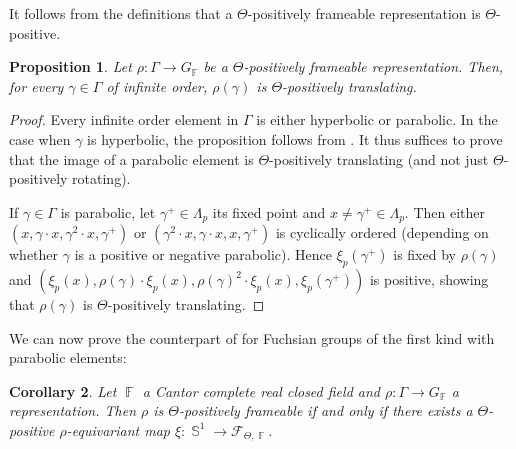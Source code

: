 \documentclass{amsart}
\theoremstyle{plain}
\newtheorem{proposition}{Proposition}[section]
\newtheorem{corollary}[proposition]{Corollary}
\theoremstyle{definition}
\DeclareMathOperator{\Fb}{{\mathbb{F}}}
\DeclareMathOperator{\Sb}{\mathbb{S}}
\newcommand{\1}{\mathbf{1}}
\begin{document}
It follows from the definitions that a $\Theta$-positively frameable representation is $\Theta$-positive. 


\begin{proposition}\label{framed positive implies positively translating}
    Let $\rho \colon \Gamma \to G_{\Fb}$ be a $\Theta$-positively frameable representation. Then, for every $\gamma \in \Gamma$ of infinite order, $\rho(\gamma)$ is $\Theta$-positively translating.
\end{proposition}

\begin{proof}
    Every infinite order element in $\Gamma$ is either hyperbolic or parabolic. In the case when $\gamma$ is hyperbolic, the proposition follows from .
    It thus suffices to prove that the image of a parabolic element is $\Theta$-positively translating (and not just $\Theta$-positively rotating).

    If $\gamma \in \Gamma$ is parabolic, let $\gamma^+\in \Lambda_p$ its fixed point and $x \neq \gamma^+ \in \Lambda_p$.
    Then either $(x,\gamma \cdot x, \gamma^2 \cdot x, \gamma^+)$ or $(\gamma^2\cdot x, \gamma\cdot x, x, \gamma^+)$ is cyclically ordered (depending on whether $\gamma$ is a positive or negative parabolic).
    Hence $\xi_p(\gamma^+)$ is fixed by $\rho(\gamma)$ and $(\xi_p(x), \rho(\gamma)\cdot \xi_p(x), \rho(\gamma)^2 \cdot \xi_p(x), \xi_p(\gamma^+))$ is positive, showing that $\rho(\gamma)$ is $\Theta$-positively translating.
\end{proof}

We can now prove the counterpart of  for Fuchsian groups of the first kind with parabolic elements:
\begin{corollary}\label{extension cor}
    Let $\Fb$ a Cantor complete real closed field and $\rho \colon \Gamma \to G_{\Fb}$ a representation.
    Then $\rho$ is $\Theta$-positively frameable if and only if there exists a $\Theta$-positive $\rho$-equivariant map $\xi \colon \Sb^1 \to \mathcal F_{\Theta,\Fb}$.
\end{corollary}
\end{document}

